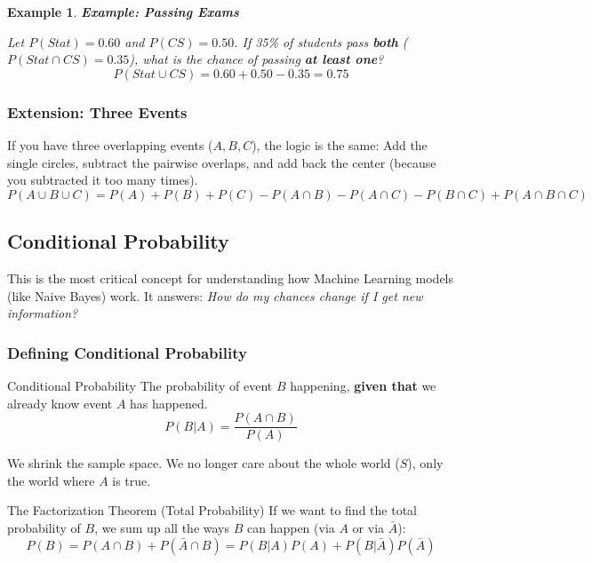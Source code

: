 \documentclass[11pt]{article}
\theoremstyle{smallexample}
\newtheorem{example}{Example}[section]
\begin{document}
\begin{example}{\textbf{Example: Passing Exams}}

Let $P(Stat) = 0.60$ and $P(CS) = 0.50$.
If 35\% of students pass \textbf{both} ($P(Stat \cap CS) = 0.35$), what is the chance of passing \textbf{at least one}?
\[ P(Stat \cup CS) = 0.60 + 0.50 - 0.35 = 0.75 \]
\end{example}

\subsubsection{Extension: Three Events}
If you have three overlapping events ($A, B, C$), the logic is the same: Add the single circles, subtract the pairwise overlaps, and add back the center (because you subtracted it too many times).
\[ P(A \cup B \cup C) = P(A) + P(B) + P(C) - P(A \cap B) - P(A \cap C) - P(B \cap C) + P(A \cap B \cap C) \]

\subsection{Conditional Probability}

This is the most critical concept for understanding how Machine Learning models (like Naive Bayes) work. It answers: \textit{How do my chances change if I get new information?}

\subsubsection{Defining Conditional Probability}

\begin{defbox}{Conditional Probability}
The probability of event $B$ happening, \textbf{given that} we already know event $A$ has happened.
\begin{equation}
    P(B|A) = \frac{P(A \cap B)}{P(A)}
\end{equation}
\end{defbox}
We shrink the sample space. We no longer care about the whole world ($S$), only the world where $A$ is true.


\begin{defbox}{The Factorization Theorem (Total Probability)}
If we want to find the total probability of $B$, we sum up all the ways $B$ can happen (via $A$ or via $\bar{A}$):
\begin{equation}
    P(B) = P(A \cap B) + P(\bar{A} \cap B) =P(B|A)P(A) + P(B|\bar{A})P(\bar{A})
\end{equation}
\end{defbox}
\end{document}
